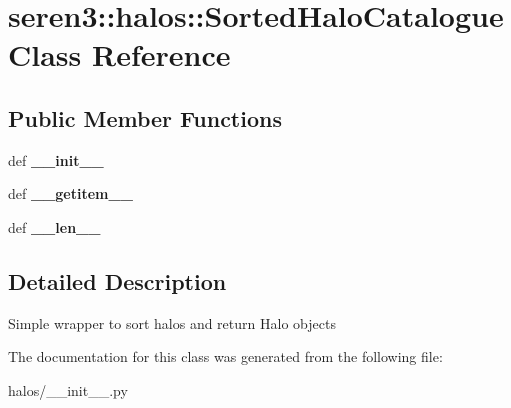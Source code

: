\hypertarget{classseren3_1_1halos_1_1SortedHaloCatalogue}{
\section{seren3::halos::SortedHaloCatalogue Class Reference}
\label{classseren3_1_1halos_1_1SortedHaloCatalogue}
}
\subsection*{Public Member Functions}
\begin{DoxyCompactItemize}
\item 
\hypertarget{classseren3_1_1halos_1_1SortedHaloCatalogue_a8b9a40ae2c277d6c4c9743dce9c30e03}{
def {\bfseries \_\-\_\-init\_\-\_\-}}
\label{classseren3_1_1halos_1_1SortedHaloCatalogue_a8b9a40ae2c277d6c4c9743dce9c30e03}

\item 
\hypertarget{classseren3_1_1halos_1_1SortedHaloCatalogue_af3132583f5cec1487d4e088f731dfbef}{
def {\bfseries \_\-\_\-getitem\_\-\_\-}}
\label{classseren3_1_1halos_1_1SortedHaloCatalogue_af3132583f5cec1487d4e088f731dfbef}

\item 
\hypertarget{classseren3_1_1halos_1_1SortedHaloCatalogue_a2940cc326d650177aae67e365c3e58a1}{
def {\bfseries \_\-\_\-len\_\-\_\-}}
\label{classseren3_1_1halos_1_1SortedHaloCatalogue_a2940cc326d650177aae67e365c3e58a1}

\end{DoxyCompactItemize}


\subsection{Detailed Description}
\begin{DoxyVerb}
Simple wrapper to sort halos and return Halo
objects
\end{DoxyVerb}
 

The documentation for this class was generated from the following file:\begin{DoxyCompactItemize}
\item 
halos/\_\-\_\-init\_\-\_\-.py\end{DoxyCompactItemize}
